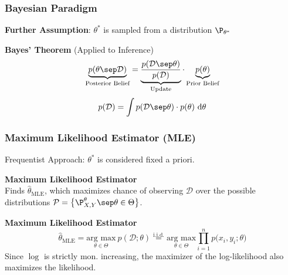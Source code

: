 \subsubsection{Bayesian Paradigm}

\textbf{Further Assumption}: $\theta^*$ is sampled from a distribution $\P_{\theta^*}$\\

\theorem \textbf{Bayes' Theorem} (Applied to Inference)
$$
    \underbrace{p(\theta \sep \mathcal{D})}_\text{Posterior Belief} = \underbrace{\frac{p(\mathcal{D}\sep\theta)}{p(\mathcal{D})}}_\text{Update} \cdot \underbrace{p(\theta)}_\text{Prior Belief}
$$
$$
    p(\mathcal{D}) = \int p(\mathcal{D}\sep\theta) \cdot p(\theta)\ \text{d}\theta
$$

\subsubsection{Maximum Likelihood Estimator (MLE)}

Frequentist Approach: $\theta^*$ is considered fixed a priori.

\method \textbf{Maximum Likelihood Estimator}\\
Finds $\hat{\theta}_\text{MLE}$, which maximizes chance of observing $\mathcal{D}$ over the possible distributions $\mathcal{P} = \bigl\{ \P^\theta_{X,Y} \sep \theta \in \Theta \bigr\}$.

 \textbf{Maximum Likelihood Estimator}\\
$$
    \hat{\theta}_\text{MLE} = \underset{\theta\in\Theta}{\text{arg max}}\ p(\mathcal{D};\theta) \overset{\text{i.i.d.}}{=} \underset{\theta\in\Theta}{\text{arg max}}\prod_{i=1}^n p\bigl( x_i,y_i;\theta \bigr) 
$$ 
{\footnotesize
    \remark Since $\log$ is strictly mon. increasing, the maximizer of the log-likelihood also maximizes the likelihood.
}

